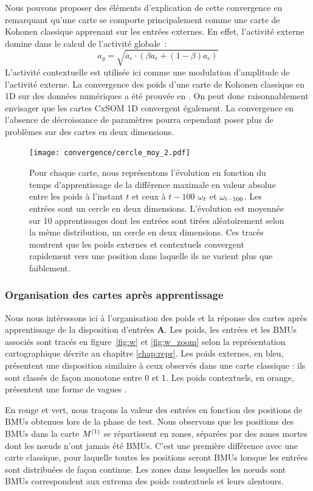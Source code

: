 \documentclass[../main]{subfiles}
\begin{document}
Nous pouvons proposer des éléments d'explication de cette convergence en remarquant qu'une carte se comporte principalement comme une carte de Kohonen classique apprenant sur les entrées externes. En effet, l'activité externe domine dans le calcul de l'activité globale~:
$$ a_g = \sqrt{a_e \cdot (\beta a_e + (1-\beta)a_c)}$$
L'activité contextuelle est utilisée ici comme une modulation d'amplitude de l'activité externe.
La convergence des poids d'une carte de Kohonen classique en 1D sur des données numériques a été prouvée en \cite{cottrell_theoretical_2016}. 
On peut donc raisonnablement envisager que les cartes CxSOM 1D convergent également.
La convergence en l'absence de décroissance de paramètres pourra cependant poser plus de problèmes sur des cartes en deux dimensions.

\begin{figure}[ht]
	\texttt{[image: convergence/cercle\_moy\_2.pdf]}
	\vspace{-0.5cm}
	\caption{Pour chaque carte, nous représentons l'évolution en fonction du temps d'apprentissage de la différence maximale en valeur absolue entre les poids à l'instant $t$ et ceux à $t-100$ $\omega_t$ et $\omega_{t-100}$. Les entrées sont un cercle en deux dimensions. 
	L'évolution est moyennée sur 10 apprentissages dont les entrées sont tirées aléatoirement selon la même distribution, un cercle en deux dimensions.
	Ces tracés montrent que les poids externes et contextuels convergent rapidement vers une position dans laquelle ils ne varient plus que faiblement.\label{fig:conv}}
\end{figure}


\subsubsection{Organisation des cartes après apprentissage}

Nous nous intéressons ici à l'organisation des poids et la réponse des cartes après apprentissage de la disposition d'entrées \textbf{A}.
Les poids, les entrées et les BMUs associés sont tracés en figure~\ref{fig:w} et \ref{fig:w_zoom} selon la représentation cartographique décrite au chapitre \ref{chap:repr}.
Les poids externes, en bleu, présentent une disposition similaire à ceux observés dans une carte classique : ils sont classés de façon monotone entre 0 et 1.
Les poids contextuels, en orange, présentent une forme de \og vagues \fg{}. 

En rouge et vert, nous traçons la valeur des entrées en fonction des positions de BMUs obtenues lors de la phase de test.
Nous observons que les positions des BMUs dans la carte $M^{({1})}$ se répartissent en zones, séparées par des zones mortes dont les n\oe{}uds n'ont jamais été BMUs. C'est une première différence avec une carte classique, pour laquelle toutes les positions seront BMUs lorsque les entrées sont distribuées de façon continue.
Les zones dans lesquelles les n\oe{}uds sont BMUs correspondent aux extrema des poids contextuels et leurs alentours.
\end{document}

